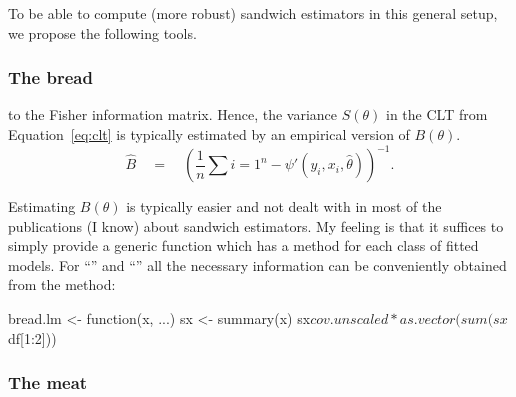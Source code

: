 \documentclass{Z}
\begin{document}
To be able to compute (more robust) sandwich estimators in this general setup, we
propose the following tools. 

\subsubsection*{The bread}


to the Fisher information matrix. Hence, the variance $S(\theta)$ in the CLT from Equation~\ref{eq:clt}
is typically estimated by an empirical version of $B(\theta)$.
\begin{equation} \label{eq:Bhat}
  \hat B \quad = \quad \left( \frac{1}{n} \sum{i = 1}^n - \psi'(y_i, x_i, \hat \theta) \right)^{-1}.
\end{equation}


Estimating $B(\theta)$ is typically easier and not dealt with in most of the publications
(I know) about sandwich estimators. My feeling is that it suffices to simply provide a 
generic function  which has a method for each class of fitted models.
For ``'' and ``'' all the necessary information can be conveniently
obtained from the  method:
\begin{Schunk}
\begin{Sinput}
bread.lm <- function(x, ...)
{
  sx <- summary(x)
  sx$cov.unscaled * as.vector(sum(sx$df[1:2]))
}
\end{Sinput}
\end{Schunk}





\subsubsection*{The meat}
\end{document}
